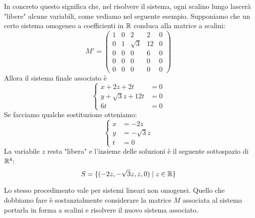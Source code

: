 \begin{observation}
	In concreto questo significa che, nel risolvere il sistema, ogni scalino
	lungo lascerà "libere" alcune variabili, come vediamo nel seguente esempio.
	Supponiamo che un certo sistema omogeneo a coefficienti in $\mathbb{R}$
	conduca alla matrice a scalini:
	\[
		M' = \begin{pmatrix}
			1 & 0 & 2        & 2  & 0 \\
			0 & 1 & \sqrt{3} & 12 & 0 \\
			0 & 0 & 0        & 6  & 0 \\
			0 & 0 & 0        & 0  & 0 \\
			0 & 0 & 0        & 0  & 0
		\end{pmatrix}
	\]
	Allora il sistema finale associato è
	\[
		\begin{cases}
			x + 2z + 2t         & = 0 \\
			y + \sqrt{3}z + 12t & = 0 \\
			6t                  & = 0
		\end{cases}
	\]
	Se facciamo qualche sostituzione otteniamo:
	\[
		\begin{cases}
			x & = -2z         \\
			y & = -\sqrt{3} z \\
			t & = 0
		\end{cases}
	\]
	La variabile $z$ resta "libera" e l'insieme delle soluzioni è il seguente
	sottospazio di $\mathbb{R}^4$:
	\[
		S = \{ (-2z, -\sqrt{3}z, z, 0 ) \mid z \in \mathbb{R} \}
	\]
\end{observation}

Lo stesso procedimento vale per sistemi lineari non omogenei.
Quello che dobbiamo fare è sostanzialmente considerare la matrice $M$ associata
al sistema portarla in forma a scalini e risolvere il nuovo sistema associato.

